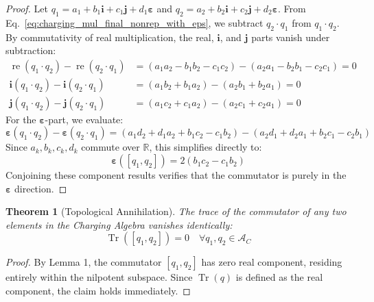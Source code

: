 \documentclass[11pt,a4paper]{book}
\newtheorem{theorem}{Theorem}
\begin{document}
\begin{proof}
Let $q_1 = a_1 + b_1\mathbf{i} + c_1\mathbf{j} + d_1\boldsymbol{\varepsilon}$ and $q_2 = a_2 + b_2\mathbf{i} + c_2\mathbf{j} + d_2\boldsymbol{\varepsilon}$. From Eq.~\eqref{eq:charging_mul_final_nonrep_with_eps}, we subtract $q_2 \cdot q_1$ from $q_1 \cdot q_2$.
By commutativity of real multiplication, the real, $\mathbf{i}$, and $\mathbf{j}$ parts vanish under subtraction:
\begin{equation}
\begin{aligned}
\operatorname{re}(q_1 \cdot q_2) - \operatorname{re}(q_2 \cdot q_1) &= (a_1 a_2 - b_1 b_2 - c_1 c_2) - (a_2 a_1 - b_2 b_1 - c_2 c_1) = 0 \\
\mathbf{i}(q_1 \cdot q_2) - \mathbf{i}(q_2 \cdot q_1) &= (a_1 b_2 + b_1 a_2) - (a_2 b_1 + b_2 a_1) = 0 \\
\mathbf{j}(q_1 \cdot q_2) - \mathbf{j}(q_2 \cdot q_1) &= (a_1 c_2 + c_1 a_2) - (a_2 c_1 + c_2 a_1) = 0
\end{aligned}
\end{equation}
For the $\boldsymbol{\varepsilon}$-part, we evaluate:
\begin{equation}
\boldsymbol{\varepsilon}(q_1 \cdot q_2) - \boldsymbol{\varepsilon}(q_2 \cdot q_1) = (a_1 d_2 + d_1 a_2 + b_1 c_2 - c_1 b_2) - (a_2 d_1 + d_2 a_1 + b_2 c_1 - c_2 b_1)
\end{equation}
Since $a_k, b_k, c_k, d_k$ commute over $\mathbb{R}$, this simplifies directly to:
\begin{equation}
\boldsymbol{\varepsilon}([q_1, q_2]) = 2(b_1 c_2 - c_1 b_2)
\end{equation}
Conjoining these component results verifies that the commutator is purely in the $\boldsymbol{\varepsilon}$ direction.
\end{proof}

\begin{theorem}[Topological Annihilation]
The trace of the commutator of any two elements in the Charging Algebra vanishes identically:
\begin{equation}
\operatorname{Tr}([q_1, q_2]) = 0 \quad \forall q_1, q_2 \in \mathcal{A}_C
\end{equation}
\end{theorem}

\begin{proof}
By Lemma 1, the commutator $[q_1, q_2]$ has zero real component, residing entirely within the nilpotent subspace. Since $\operatorname{Tr}(q)$ is defined as the real component, the claim holds immediately.
\end{proof}
\end{document}
